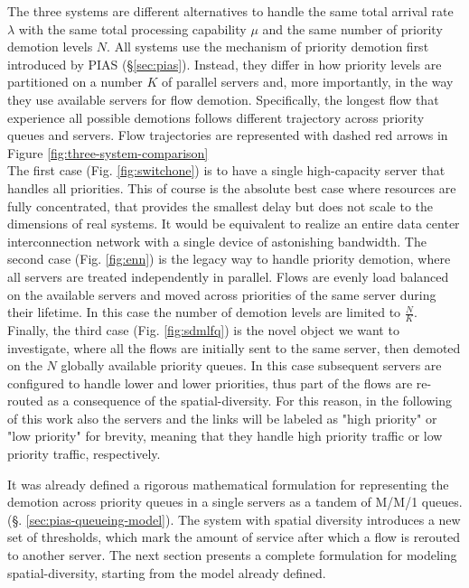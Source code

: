 The three systems are different alternatives to handle the same total arrival rate $\lambda$ with the same total processing capability $\mu$ and the same number of priority demotion levels $N$. All systems use the mechanism of priority demotion first introduced by PIAS (\S \ref{sec:pias}). Instead, they differ in how priority levels are partitioned on a number $K$ of parallel servers and, more importantly, in the way they use available servers for flow demotion. Specifically, the longest flow that experience all possible demotions follows different trajectory across priority queues and servers. Flow trajectories are represented with dashed red arrows in Figure \ref{fig:three-system-comparison}\\
The first case (Fig. \ref{fig:switchone}) is to have a single high-capacity server that handles all priorities. This of course is the absolute best case where resources are fully concentrated, that provides the smallest delay but does not scale to the dimensions of real systems. It would be equivalent to realize an entire data center interconnection network with a single device of astonishing bandwidth. The second case (Fig. \ref{fig:enn}) is the legacy way to handle priority demotion, where all servers are treated independently in parallel. Flows are evenly load balanced on the available servers and moved across priorities of the same server during their lifetime. In this case the number of demotion levels are limited to \small$\frac{N}{K}$\normalsize. Finally, the third case (Fig. \ref{fig:sdmlfq}) is the novel object we want to investigate, where all the flows are initially sent to the same server, then demoted on the $N$ globally available priority queues. In this case subsequent servers are configured to handle lower and lower priorities, thus part of the flows are re-routed as a consequence of the spatial-diversity. For this reason, in the following of this work also the servers and the links will be labeled as "high priority" or "low priority" for brevity, meaning that they handle high priority traffic or low priority traffic, respectively. 

It was already defined a rigorous mathematical formulation for representing the demotion across priority queues in a single servers as a tandem of M/M/1 queues. (\S. \ref{sec:pias-queueing-model}). The system with spatial diversity introduces a new set of thresholds, which mark the amount of service after which a flow is rerouted to another server. The next section presents a complete formulation for modeling spatial-diversity, starting from the model already defined. 
